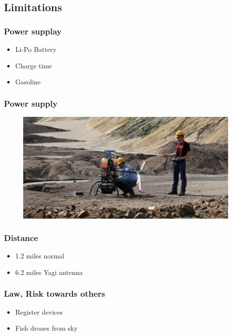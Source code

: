 \subsection{Limitations}

\begin{frame}
\frametitle{Power supplay}

  \begin{itemize}
    \item Li-Po Battery    
    \item Charge time    
	\item Gasoline
  \end{itemize}
  
\end{frame}



\begin{frame}
\frametitle{Power supply}

  \begin{figure}
  \includegraphics[scale=0.24]{pic/03_our-copter/aeroscout.jpg}
  \end{figure}
  
\end{frame}



\begin{frame}
\frametitle{Distance}

  \begin{itemize}
    \item 1.2 miles normal
    \item 6.2 miles Yagi antenna
  \end{itemize}
  
    
\end{frame}



\begin{frame}
\frametitle{Law, Risk towards others}

  \begin{itemize}
    \item Register devices    
	\item Fish drones from sky
  \end{itemize}
  	
\end{frame}










